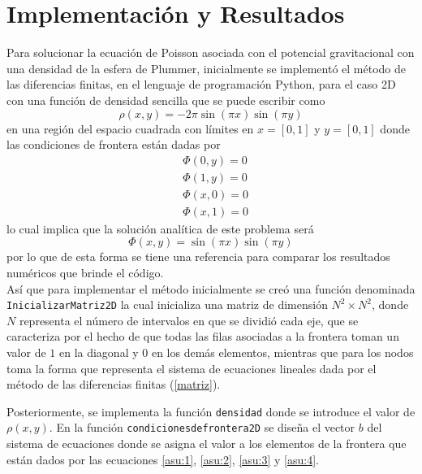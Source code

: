 \documentclass[reprint,amsmath,amssymb,aps]{revtex4-1}
\begin{document}
\section{Implementación y Resultados}
Para solucionar la ecuación de Poisson asociada con el potencial gravitacional con una densidad de la esfera de Plummer, inicialmente se implementó el método de las diferencias finitas, en el lenguaje de programación Python, para el caso 2D con una función de densidad sencilla que se puede escribir como
\begin{equation}
    \rho(x,y)=-2\pi \sin(\pi x) \sin (\pi y)
\end{equation}
en una región del espacio cuadrada con límites en $x=[0,1]$ y $y=[0,1]$ donde las condiciones de frontera están dadas por
\begin{eqnarray}
&\varPhi(0,y)=0 \label{asu:1}\\
&\varPhi(1,y)=0 \label{asu:2}\\
&\varPhi(x,0)=0 \label{asu:3}\\
&\varPhi(x,1)=0 \label{asu:4}
\end{eqnarray}
lo cual implica que la solución analítica de este problema será 
\begin{equation}
\varPhi(x,y)=\sin(\pi x) \sin (\pi y) \label{asu:5}
\end{equation}
por lo que de esta forma se tiene una referencia para comparar los resultados numéricos que brinde el código.\\

Así que para implementar el método inicialmente se creó una función denominada \texttt{InicializarMatriz2D} la cual inicializa una matriz de dimensión $N^2 \times  N^2$, donde $N$ representa el número de intervalos en que se dividió cada eje, que se caracteriza por el hecho de que todas las filas asociadas a la frontera toman un valor de $1$ en la diagonal y $0$ en los demás elementos, mientras que para los nodos toma la forma que representa el sistema de ecuaciones lineales dada por el método de las diferencias finitas (\ref{matriz}).

Posteriormente, se implementa la función \texttt{densidad} donde se introduce el valor de $\rho(x,y)$. En la función \texttt{condicionesdefrontera2D} se diseña el vector $b$ del sistema de ecuaciones donde se asigna el valor a los elementos de la frontera que están dados por las ecuaciones \ref{asu:1}, \ref{asu:2}, \ref{asu:3} y \ref{asu:4}. \\
\end{document}
